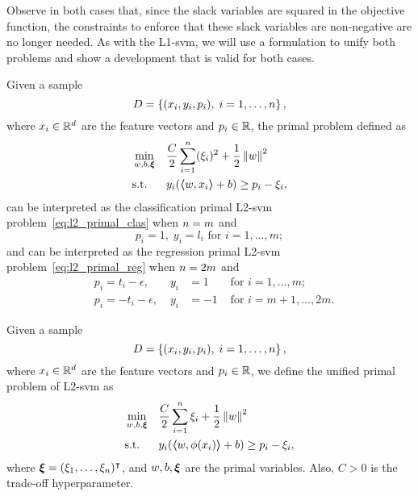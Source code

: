 %
Observe in both cases that, since the slack variables are squared in the objective function, the constraints to enforce that these slack variables are non-negative are no longer needed.
As with the L1-\acrshort{svm}, we will use a formulation to unify both problems and show a development that is valid for both cases. 
%
%
\begin{lemma}
    Given a sample
    $$ D = \left\{(x_i, y_i, p_i), \; i=1, \ldots, n\right\} ,$$
    where $x_i \in \mathbb{R}^d$ are the feature vectors and $p_i \in \mathbb{R}$, 
    the primal problem defined as
    \begin{equation}
        \nonumber
        \begin{aligned}
            &\min_{w, b, \bm{\xi}} & & \frac{C}{2} \sum_{i=1}^n (\xi_i)^2 + \frac{1}{2} \left\lVert w\right\rVert^2 \\
            & \text{s.t.} & & y_i (\bm{\left\langle} w, x_i \bm{\right\rangle} + b) \geq p_i - \xi_i ,     
        \end{aligned}  
    \end{equation}
    can be interpreted as the classification primal L2-\acrshort{svm} problem~\eqref{eq:l2_primal_clas} when $n=m$ and
    $$ p_i = 1,\; y_i = l_i \text{ for } i=1, \ldots, m ;$$
    and can be interpreted as the regression primal L2-\acrshort{svm} problem~\eqref{eq:l2_primal_reg} when $n = 2 m$ and
    \begin{equation}
        \nonumber
        \begin{aligned}
            & p_i = t_i - \epsilon ,\; &y_i &= 1 &\text{ for } i=1, \ldots, m ; \\
            & p_i = -t_i - \epsilon ,\; &y_i &= -1 &\text{ for } i=m+1, \ldots, 2m .
        \end{aligned}
    \end{equation}
\end{lemma}
%
\begin{definition}
    Given a sample
    $$ D = \left\{(x_i, y_i, p_i), \; i=1, \ldots, n\right\} ,$$
    where $x_i \in \mathbb{R}^d$ are the feature vectors and $p_i \in \mathbb{R}$, 
    we define the unified primal problem of L2-\acrshort{svm} as
    \begin{equation}
        \label{eq:l2_primal}
        \begin{aligned}
            &\min_{w, b, \fv{\xi}} & & \frac{C}{2} \sum_{i=1}^\nsamples \xi_i + \frac{1}{2} \norm{w}^2 \\
            & \text{s.t.} & & y_i (\dotp{w}{\phi(x_i)} + b) \geq p_i - \xi_i ,      
        \end{aligned}  
    \end{equation}
    where $\bm{\xi} = (\xi_1, \ldots, \xi_n)^\intercal$, and $w, b, \bm{\xi}$ are the primal variables. Also, $C > 0$ is the trade-off hyperparameter.
\end{definition}
